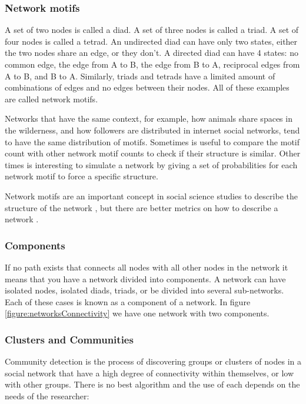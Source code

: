 \subsubsection{Network motifs}

A set of two nodes is called a diad. A set of three nodes is called a triad. A set of four nodes is called a tetrad. An undirected diad can have only two states, either the two nodes share an edge, or they don't. A directed diad can have 4 states: no common edge, the edge from A to B, the edge from B to A, reciprocal edges from A to B, and B to A. Similarly, triads and tetrads have a limited amount of combinations of edges and no edges between their nodes. All of these examples are called network motifs.

Networks that have the same context, for example, how animals share spaces in the wilderness, and how followers are distributed in internet social networks, tend to have the same distribution of motifs. Sometimes is useful to compare the motif count with other network motif counts to check if their structure is similar. Other times is interesting to simulate a network by giving a set of probabilities for each network motif to force a specific structure.

Network motifs are an important concept in social science studies to describe the structure of the network \cite{Faust2010}, but there are better metrics on how to describe a network \cite{Faust2007}.

\subsubsection{Components}

 If no path exists that connects all nodes with all other nodes in the network it means that you have a network divided into components. A network can have isolated nodes, isolated diads, triads, or be divided into several sub-networks. Each of these cases is known as a component of a network. In figure \ref{figure:networksConnectivity} we have one network with two components. 

\subsubsection{Clusters and Communities}

Community detection is the process of discovering groups or clusters of nodes in a social network that have a high degree of connectivity within themselves, or low with other groups. There is no best algorithm and the use of each depends on the needs of the researcher:

